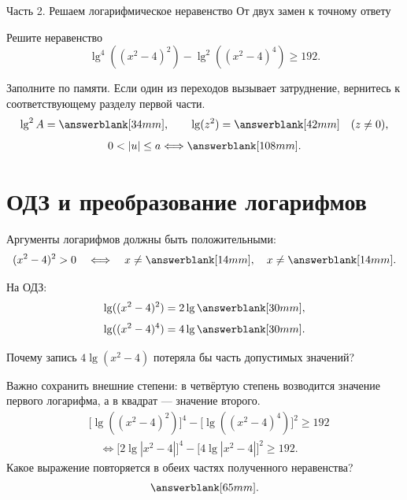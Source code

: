 \worksheettitle
  {Часть 2. Решаем логарифмическое неравенство}
  {От двух замен к точному ответу}
\studentnameblock

\begin{problembox}
  Решите неравенство
  \[
    \lg^4((x^2-4)^2)-\lg^2((x^2-4)^4)\ge192.
  \]
\end{problembox}

\begin{checkpointbox}
  Заполните по памяти. Если один из переходов вызывает затруднение,
  вернитесь к соответствующему разделу первой части.
  \[
    \lg^2 A=\answerblank[34mm], 
    \qquad
    \lg(z^2)=\answerblank[42mm]\quad(z\ne0),
  \]
  \[
    0<|u|\le a
    \Longleftrightarrow
    \answerblank[108mm].
  \]
\end{checkpointbox}

\section{ОДЗ и преобразование логарифмов}

Аргументы логарифмов должны быть положительными:
\[
  (x^2-4)^2>0
  \quad\Longleftrightarrow\quad
  x\ne\answerblank[14mm],\quad x\ne\answerblank[14mm].
\]

На ОДЗ:
\[
  \lg((x^2-4)^2)=2\lg\answerblank[30mm],
\]
\[
  \lg((x^2-4)^4)=4\lg\answerblank[30mm].
\]
\newpage
\begin{reflectionbox}
  Почему запись \(4\lg(x^2-4)\) потеряла бы часть допустимых значений?
\end{reflectionbox}

\begin{fillbox}
  Важно сохранить внешние степени: в четвёртую степень возводится значение
  первого логарифма, а в квадрат --- значение второго.
  \[
    \begin{aligned}
      &\bigl[\lg((x^2-4)^2)\bigr]^4
      -\bigl[\lg((x^2-4)^4)\bigr]^2\ge192\\
      &\quad\Longleftrightarrow
      \bigl[2\lg|x^2-4|\bigr]^4
      -\bigl[4\lg|x^2-4|\bigr]^2\ge192.
    \end{aligned}
  \]
  Какое выражение повторяется в обеих частях полученного неравенства?
  \[
    \answerblank[65mm].
  \]
\end{fillbox}

